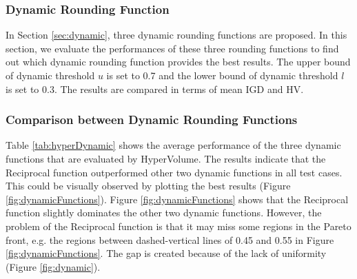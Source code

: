 \documentclass[10pt,journal,compsoc]{IEEEtran}
\begin{document}
\subsubsection{Dynamic Rounding Function}
In Section \ref{sec:dynamic}, three dynamic rounding functions are proposed. In this section, we evaluate the performances of these three rounding functions to find out which dynamic rounding function provides the best results.  The upper bound of dynamic threshold $u$ is set to 0.7 and the lower bound of dynamic threshold $l$ is set to 0.3. The results are compared in terms of mean IGD and HV.

\subsubsection{Comparison between Dynamic Rounding Functions}
\label{sec:expdy}
Table \ref{tab:hyperDynamic} shows the average performance of the three dynamic functions that are evaluated by HyperVolume.
The results indicate that the Reciprocal function outperformed other two dynamic functions in all test cases. This could be visually observed by plotting the best results (Figure \ref{fig:dynamicFunctions}).
Figure \ref{fig:dynamicFunctions} shows that the Reciprocal function slightly dominates the other two dynamic functions. However, the problem of the Reciprocal function is that it may miss some regions in the Pareto front, e.g. the regions between dashed-vertical lines of 0.45 and 0.55 in Figure \ref{fig:dynamicFunctions}. The gap is created because of the lack of uniformity (Figure \ref{fig:dynamic}).
\end{document}
